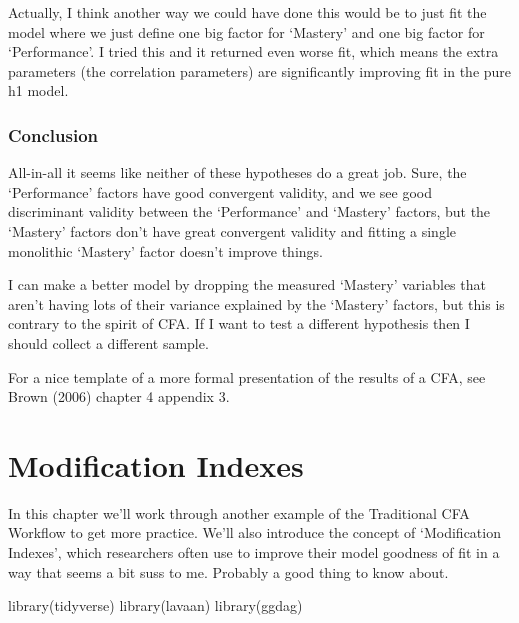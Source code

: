 \documentclass[
  letterpaper,
  DIV=11,
  numbers=noendperiod]{scrreprt}
\newenvironment{Shaded}{\begin{snugshade}}{\end{snugshade}}
\newcommand{\FunctionTok}[1]{\textcolor[rgb]{0.28,0.35,0.67}{#1}}
\newcommand{\NormalTok}[1]{\textcolor[rgb]{0.00,0.23,0.31}{#1}}
\begin{document}
Actually, I think another way we could have done this would be to just
fit the model where we just define one big factor for `Mastery' and one
big factor for `Performance'. I tried this and it returned even worse
fit, which means the extra parameters (the correlation parameters) are
significantly improving fit in the pure h1 model.

\hypertarget{conclusion}{%
\subsection*{Conclusion}\label{conclusion}}

All-in-all it seems like neither of these hypotheses do a great job.
Sure, the `Performance' factors have good convergent validity, and we
see good discriminant validity between the `Performance' and `Mastery'
factors, but the `Mastery' factors don't have great convergent validity
and fitting a single monolithic `Mastery' factor doesn't improve things.

I can make a better model by dropping the measured `Mastery' variables
that aren't having lots of their variance explained by the `Mastery'
factors, but this is contrary to the spirit of CFA. If I want to test a
different hypothesis then I should collect a different sample.

For a nice template of a more formal presentation of the results of a
CFA, see Brown (2006) chapter 4 appendix 3.

\hypertarget{modification-indexes}{%
\chapter{Modification Indexes}\label{modification-indexes}}

In this chapter we'll work through another example of the Traditional
CFA Workflow to get more practice. We'll also introduce the concept of
`Modification Indexes', which researchers often use to improve their
model goodness of fit in a way that seems a bit suss to me. Probably a
good thing to know about.

\begin{Shaded}
\begin{Highlighting}[]
\FunctionTok{library}\NormalTok{(tidyverse)}
\FunctionTok{library}\NormalTok{(lavaan)}
\FunctionTok{library}\NormalTok{(ggdag)}
\end{Highlighting}
\end{Shaded}
\end{document}
